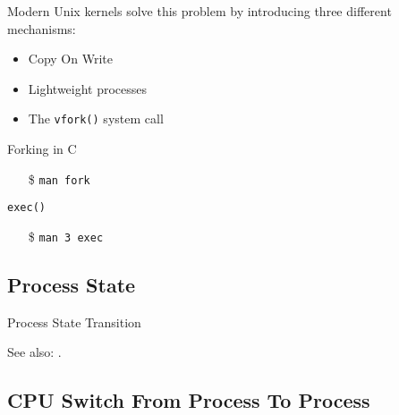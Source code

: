 Modern Unix kernels solve this problem by introducing three different mechanisms:
\begin{itemize}
\item Copy On Write
\item Lightweight processes
\item The \texttt{vfork()} system call
\end{itemize}


\begin{frame}{Forking in C}
  \begin{center}
  \end{center}
  \begin{itemize}
  \item[\$] \texttt{man fork}
  \end{itemize}
\end{frame}

\begin{frame}{\texttt{exec()}}
  \begin{center}
  \end{center}
  \begin{itemize}
  \item[\$] \texttt{man 3 exec}
  \end{itemize}
\end{frame}

\subsection{Process State}

\begin{frame}{Process State Transition}
  \begin{center}
  \end{center}
\end{frame}

See also: .

\subsection{CPU Switch From Process To Process}
\label{sec:cpu-switch-from}

